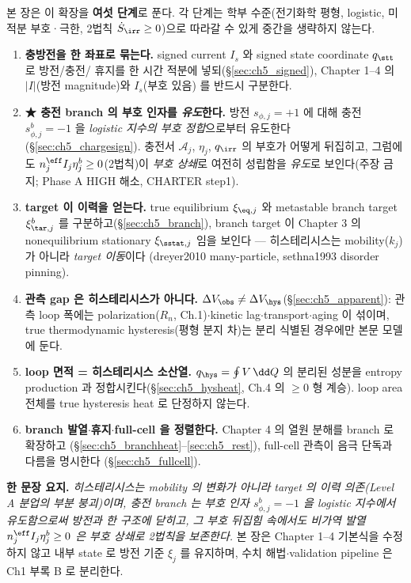 본 장은 이 확장을 \textbf{여섯 단계}로 푼다. 각 단계는 학부 수준(전기화학 평형, logistic, 미적분 부호·극한,
2법칙 $\dot S_\irr\ge0$)으로 따라갈 수 있게 중간을 생략하지 않는다.
\begin{enumerate}[label=\textbf{(\arabic*)},leftmargin=2.2em]
\item \textbf{충방전을 한 좌표로 묶는다.} signed current $I_s$ 와 signed state coordinate $q_\stt$ 로 방전/충전/
  휴지를 한 시간 적분에 넣되(\S\ref{sec:ch5_signed}), Chapter 1--4 의 $|I|$(방전 magnitude)와 $I_s$(부호 있음)
  를 반드시 구분한다.
\item \textbf{★ 충전 branch 의 부호 인자를 \emph{유도}한다.} 방전 $s_{\phi,j}=+1$ 에 대해 충전
  $s_{\phi,j}^b=-1$ 을 \emph{logistic 지수의 부호 정합}으로부터 유도한다(\S\ref{sec:ch5_chargesign}). 충전서
  $\mathcal A_j$, $\eta_j$, $q_\irr$ 의 부호가 어떻게 뒤집히고, 그럼에도 $n_j^{\eff}I_j\eta_j^b\ge0$(2법칙)이
  \emph{부호 상쇄}로 여전히 성립함을 \emph{유도}로 보인다(주장 금지; Phase A HIGH 해소, CHARTER step1).
\item \textbf{target 이 이력을 얻는다.} true equilibrium $\xi_{\eq,j}$ 와 metastable branch target
  $\xi_{\tar,j}^b$ 를 구분하고(\S\ref{sec:ch5_branch}), branch target 이 Chapter 3 의 nonequilibrium
  stationary $\xi_{\sstat,j}$ 임을 보인다 — 히스테리시스는 mobility($k_j$)가 아니라 \emph{target 이동}이다
  (dreyer2010 many-particle, sethna1993 disorder pinning).
\item \textbf{관측 gap 은 히스테리시스가 아니다.} $\Delta V_\obs\ne\Delta V_\hys$(\S\ref{sec:ch5_apparent}):
  관측 loop 폭에는 polarization($R_n$, Ch.1)$\cdot$kinetic lag$\cdot$transport$\cdot$aging 이 섞이며, true
  thermodynamic hysteresis(평형 분지 차)는 분리 식별된 경우에만 본문 모델에 둔다.
\item \textbf{loop 면적 = 히스테리시스 소산열.} $q_\hys=\oint V\,\dd Q$ 의 분리된 성분을 entropy production
  과 정합시킨다(\S\ref{sec:ch5_hysheat}, Ch.4 의 $\ge0$ 형 계승). loop area 전체를 true hysteresis heat 로
  단정하지 않는다.
\item \textbf{branch 발열$\cdot$휴지$\cdot$full-cell 을 정렬한다.} Chapter 4 의 열원 분해를 branch 로 확장하고
  (\S\ref{sec:ch5_branchheat}--\ref{sec:ch5_rest}), full-cell 관측이 음극 단독과 다름을 명시한다
  (\S\ref{sec:ch5_fullcell}).
\end{enumerate}

\noindent\textbf{한 문장 요지.} \emph{히스테리시스는 mobility 의 변화가 아니라 target 의 이력 의존(Level A
분업의 부분 붕괴)이며, 충전 branch 는 부호 인자 $s_{\phi,j}^b=-1$ 을 logistic 지수에서 \emph{유도}함으로써
방전과 한 구조에 닫히고, 그 부호 뒤집힘 속에서도 비가역 발열 $n_j^{\eff}I_j\eta_j^b\ge0$ 은 부호 상쇄로
2법칙을 보존한다.} 본 장은 Chapter 1--4 기본식을 수정하지 않고 내부 state 로 방전 기준 $\xi_j$ 를 유지하며,
수치 해법$\cdot$validation pipeline 은 Ch1 부록 B 로 분리한다.

